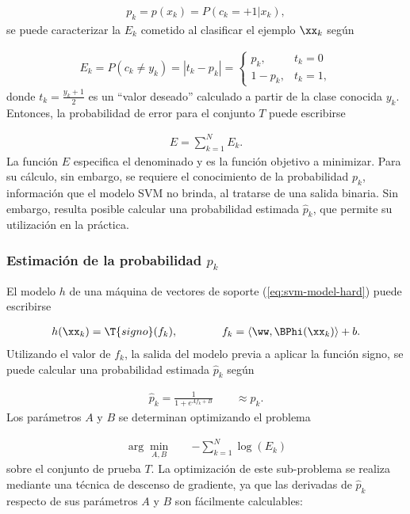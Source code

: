 \begin{align}
  p_k = p(x_k) = P(c_k=+1|x_k), %
\end{align}
se puede caracterizar la  $E_k$ cometido al
clasificar el ejemplo $\xx_k$ según

\begin{align}
\label{Ek}
  E_k = P(c_k\neq y_k) = |t_k-{p}_k| =
  \begin{cases}
    {p}_k, & t_k=0\\ 1-{p}_k, & t_k = 1,
  \end{cases}
\end{align}
donde $t_k=\frac{y_k+1}{2}$ es un ``valor deseado'' calculado a partir
de la clase conocida $y_k$.  Entonces, la probabilidad de error para
el conjunto $T$ puede escribirse

\begin{align}
\label{Err1}
  E = \sum_{k=1}^{N} E_k.
\end{align}
La función $E$ especifica el denominado  y es la
función objetivo a minimizar.  Para su cálculo, sin embargo, se
requiere el conocimiento de la probabilidad $p_k$, información que el
modelo SVM no brinda, al tratarse de una salida binaria.  Sin embargo,
resulta posible calcular una probabilidad estimada $\hat{p}_k$, que
permite su utilización en la práctica.

\subsubsection{Estimación de la probabilidad ${p}_k$}
El modelo $h$ de una máquina de vectores de soporte
(\autoref{eq:svm-model-hard}) puede escribirse

\begin{align*}
  h(\xx_k) = \T{signo}(f_k), \qquad\qquad
  f_k=\langle\ww,\BPhi(\xx_k)\rangle+b.
\end{align*}
Utilizando el valor de $f_k$, la salida del modelo
previa a aplicar la función signo, se puede calcular una probabilidad
estimada $\hat{p}_k$ según

\begin{align}
  \hat{p}_k=\frac{1}{1+e^{Af_k+B}} \qquad \approx p_k.
\end{align}
Los parámetros $A$ y $B$ se determinan optimizando el problema

\begin{align}
  \arg\min_{A,B} \quad & -\sum_{k=1}^{N} \log(E_k)
  \label{abproblem}
\end{align}
sobre el conjunto de prueba $T$. La optimización de este sub-problema
se realiza mediante una técnica de descenso de gradiente, ya que las
derivadas de $\hat{p}_k$ respecto de sus parámetros $A$ y $B$ son
fácilmente calculables:

